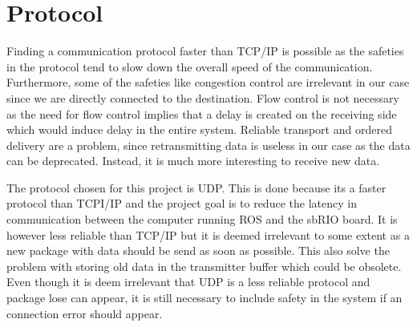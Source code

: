 \section{Protocol}\label{sec:Protocol}

Finding a communication protocol faster than TCP/IP is possible as the safeties in the protocol tend to slow down the overall speed of the communication. Furthermore, some of the safeties like congestion control are irrelevant in our case since we are directly connected to the destination. Flow control is not necessary as the need for flow control implies that a delay is created on the receiving side which would induce delay in the entire system. Reliable transport and ordered delivery are a problem, since retransmitting data is useless in our case as the data can be deprecated. Instead, it is much more interesting to receive new data. 

The protocol chosen for this project is \gls{UDP}. This is done because its a faster protocol than TCPI/IP and the project goal is to reduce the latency in communication between the computer running ROS and the sbRIO board. It is however less reliable than TCP/IP but it is deemed irrelevant to some extent as a new package with data should be send as soon as possible. This also solve the problem with storing old data in the transmitter buffer which could be obsolete. Even though it is deem irrelevant that \gls{UDP} is a less reliable protocol and package lose can appear, it is still necessary to include safety in the system if an connection error should appear.  





